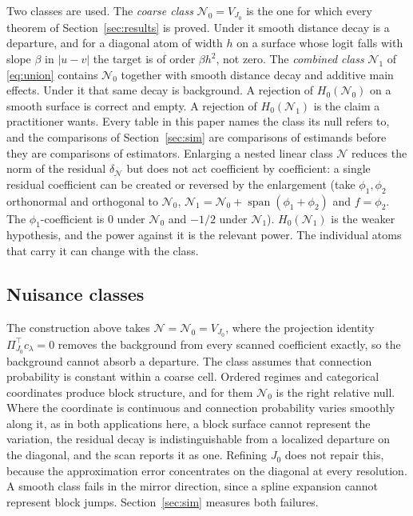 \documentclass[11pt]{article}
\theoremstyle{definition}
\newcommand{\1}{\mathbf 1}\newcommand{\op}{\operatorname}
\begin{document}
Two classes are used.  The \emph{coarse class} $\mathcal N_0=V_{J_0}$ is the one
for which every theorem of Section~\ref{sec:results} is proved.  Under it
smooth distance decay is a departure, and for a diagonal atom of width $h$ on a
surface whose logit falls with slope $\beta$ in $|u-v|$ the target is of order
$\beta h^2$, not zero.  The \emph{combined class} $\mathcal N_1$ of
\eqref{eq:union} contains $\mathcal N_0$ together with smooth distance decay and
additive main effects.  Under it that same decay is background.  A rejection of
$H_0(\mathcal N_0)$ on a smooth surface is correct and empty.  A
rejection of $H_0(\mathcal N_1)$ is the claim a practitioner wants.  Every
table in this paper names the class its null refers to, and the comparisons of
Section~\ref{sec:sim} are comparisons of estimands before they are
comparisons of estimators.  Enlarging a nested linear class $\mathcal N$ reduces the norm of the
residual $\delta_{\mathcal N}$ but does not act coefficient by coefficient: a
single residual coefficient can be created or reversed by the enlargement
(take $\phi_1,\phi_2$ orthonormal and orthogonal to $\mathcal N_0$,
$\mathcal N_1=\mathcal N_0+\operatorname{span}(\phi_1+\phi_2)$ and
$f=\phi_2$.  The $\phi_1$-coefficient is $0$ under $\mathcal N_0$ and $-1/2$
under $\mathcal N_1$).  $H_0(\mathcal N_1)$ is the weaker hypothesis, and the
power against it is the relevant power.  The individual atoms that carry it can
change with the class.

\subsection{Nuisance classes}
\label{sec:nuisance}

The construction above takes $\mathcal N=\mathcal N_0=V_{J_0}$, where the
projection identity $\Pi_{J_0}^\top c_\lambda=0$ removes the background from
every scanned coefficient exactly, so the background cannot absorb a
departure.  The class assumes that connection probability is constant within a
coarse cell.  Ordered regimes and categorical coordinates produce block
structure, and for them $\mathcal N_0$ is the right relative null.  Where the
coordinate is continuous and connection probability varies smoothly along it,
as in both applications here, a block surface cannot represent the variation,
the residual decay is indistinguishable from a localized departure on the
diagonal, and the scan reports it as one.  Refining $J_0$ does not repair
this, because the approximation error concentrates on the diagonal at every
resolution.  A smooth class fails in the mirror direction, since a spline
expansion cannot represent block jumps.  Section~\ref{sec:sim}
measures both failures.
\end{document}
